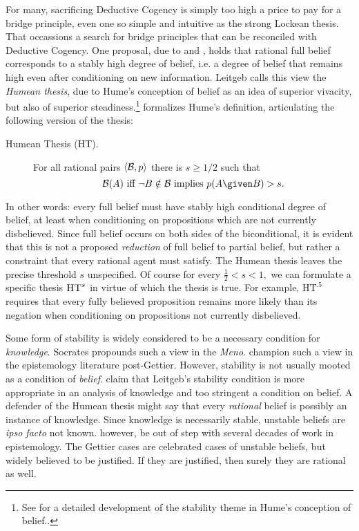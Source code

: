 For many, sacrificing Deductive Cogency is simply too high a price to pay for a
bridge principle, even one so simple and intuitive as the strong Lockean thesis.
That occassions a search for bridge principles that can be reconciled with
Deductive Cogency. One proposal, due to
\citet{leitgeb2013reducing,leitgeb2014stability,leitgeb2015humean,leitgeb2017stability}
and \citet{arlo2012belief}, holds that rational full belief corresponds to a
stably high degree of belief, i.e. a degree of belief that remains high even
after conditioning on new information. Leitgeb calls this view the {\em Humean
thesis}, due to Hume's conception of belief as an idea of superior vivacity, but
also of superior steadiness.\footnote{See \citet{loeb2002stability,
loeb2010reflection} for a detailed development of the stability theme in Hume's
conception of belief..} \citet{leitgeb2017stability} formalizes Hume's
definition, articulating the following version of the thesis:
\begin{description}
\item[Humean Thesis (HT).] For all rational pairs  $\langle \mathcal{B}, p \rangle$
there is $s\geq 1/2$ such that $$\Bel(A) \text{ iff } \neg B \notin \Bel \text{
implies } p(A \given B)> s.$$
\end{description}
In other words: every full belief must have stably high conditional degree of
belief, at least when conditioning on propositions which are not currently
disbelieved. Since full belief occurs on both sides of the biconditional, it is
evident that this is not a proposed {\em reduction} of full belief to partial
belief, but rather a constraint that every rational agent must satisfy. The
Humean thesis leaves the precise threshold $s$ unspecified. Of course for every
$\frac{1}{2}< s<1,$ we can formulate a specific thesis $\textsc{HT}^s$ in virtue
of which the thesis is true. For example, $\text{HT}^{.5}$ requires that every
fully believed proposition remains more likely than its negation when
conditioning on propositions not currently disbelieved.

Some form of stability is widely considered to be a necessary condition for {\em
knowledge}. Socrates propounds such a view in the {\em Meno}.
\citet{paxson1969knowledge} champion such a view in the epistemology literature
post-Gettier. However, stability is not usually mooted as a condition of {\em
belief}. \citet{raidl2017bridging} claim that Leitgeb's stability condition is
more appropriate in an analysis of knowledge and too stringent a condition on
belief. A defender of the Humean thesis might say that every {\em rational}
belief is possibly an instance of knowledge. Since knowledge is necessarily
stable, unstable beliefs are {\em ipso facto} not known.%
however, be out of step with several decades of work in epistemology. The
Gettier cases are celebrated cases of unstable beliefs, but widely believed to
be justified. If they are justified, then surely they are rational as well.

